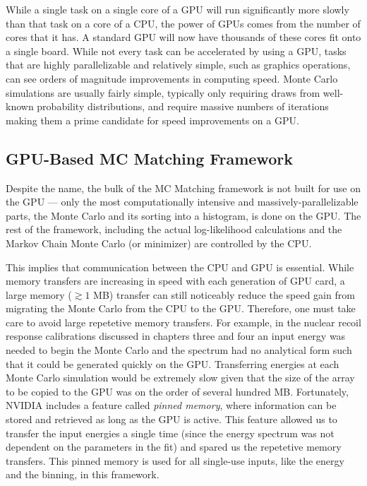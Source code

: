 While a single task on a single core of a GPU will run significantly more slowly than that task on a core of a CPU, the power of GPUs comes from the number of cores that it has.  A standard GPU will now have thousands of these cores fit onto a single board.  While not every task can be accelerated by using a GPU, tasks that are highly parallelizable and relatively simple, such as graphics operations, can see orders of magnitude improvements in computing speed.  Monte Carlo simulations are usually fairly simple, typically only requiring draws from well-known probability distributions, and require massive numbers of iterations making them a prime candidate for speed improvements on a GPU.



\subsection{GPU-Based MC Matching Framework}


Despite the name, the bulk of the MC Matching framework is not built for use on the GPU --- only the most computationally intensive and massively-parallelizable parts, the Monte Carlo and its sorting into a histogram, is done on the GPU.  The rest of the framework, including the actual log-likelihood calculations and the Markov Chain Monte Carlo (or minimizer) are controlled by the CPU.  

This implies that communication between the CPU and GPU is essential.  While memory transfers are increasing in speed with each generation of GPU card, a large memory ($\gtrsim 1$ MB) transfer can still noticeably reduce the speed gain from migrating the Monte Carlo from the CPU to the GPU.  Therefore, one must take care to avoid large repetetive memory transfers.  For example, in the nuclear recoil response calibrations discussed in chapters three and four an input energy was needed to begin the Monte Carlo and the spectrum had no analytical form such that it could be generated quickly on the GPU.  Transferring energies at each Monte Carlo simulation would be extremely slow given that the size of the array to be copied to the GPU was on the order of several hundred MB.  Fortunately, NVIDIA includes a feature called \textit{pinned memory}, where information can be stored and retrieved as long as the GPU is active.  This feature allowed us to transfer the input energies a single time (since the energy spectrum was not dependent on the parameters in the fit) and spared us the repetetive memory transfers.  This pinned memory is used for all single-use inputs, like the energy and the binning, in this framework.

